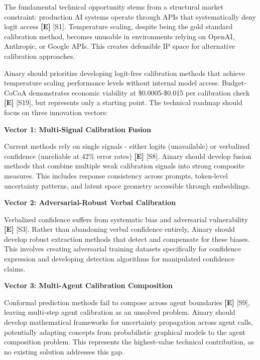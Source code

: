 \documentclass[a4paper,11pt]{article}
\newcommand{\elabel}{\textbf{\textcolor{ecolor}{[E]}}}
\begin{document}
The fundamental technical opportunity stems from a structural market constraint: production AI systems operate through APIs that systematically deny logit access \elabel{} \textcolor{primary}{[S1]}. Temperature scaling, despite being the gold standard calibration method, becomes unusable in environments relying on OpenAI, Anthropic, or Google APIs. This creates defensible IP space for alternative calibration approaches.


Ainary should prioritize developing logit-free calibration methods that achieve temperature scaling performance levels without internal model access. Budget-CoCoA demonstrates economic viability at \$0.0005-\$0.015 per calibration check \elabel{} \textcolor{primary}{[S19]}, but represents only a starting point. The technical roadmap should focus on three innovation vectors:


\textbf{Vector 1: Multi-Signal Calibration Fusion}\par
Current methods rely on single signals - either logits (unavailable) or verbalized confidence (unreliable at 42\% error rates) \elabel{} \textcolor{primary}{[S8]}. Ainary should develop fusion methods that combine multiple weak calibration signals into strong composite measures. This includes response consistency across prompts, token-level uncertainty patterns, and latent space geometry accessible through embeddings.


\textbf{Vector 2: Adversarial-Robust Verbal Calibration}\par
Verbalized confidence suffers from systematic bias and adversarial vulnerability \elabel{} \textcolor{primary}{[S3]}. Rather than abandoning verbal confidence entirely, Ainary should develop robust extraction methods that detect and compensate for these biases. This involves creating adversarial training datasets specifically for confidence expression and developing detection algorithms for manipulated confidence claims.


\textbf{Vector 3: Multi-Agent Calibration Composition}\par
Conformal prediction methods fail to compose across agent boundaries \elabel{} \textcolor{primary}{[S9]}, leaving multi-step agent calibration as an unsolved problem. Ainary should develop mathematical frameworks for uncertainty propagation across agent calls, potentially adapting concepts from probabilistic graphical models to the agent composition problem. This represents the highest-value technical contribution, as no existing solution addresses this gap.
\end{document}
